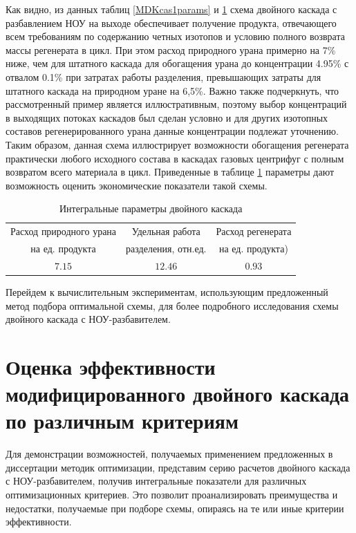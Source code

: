Как видно, из данных таблиц \ref{MDKcas1params} и \ref{MDKparams} схема двойного каскада с разбавлением НОУ на выходе обеспечивает получение продукта, отвечающего всем требованиям по содержанию четных изотопов и условию полного возврата массы регенерата в цикл. При этом расход природного урана примерно на 7\% ниже, чем для штатного каскада для обогащения урана до концентрации 4.95\% с отвалом 0.1\% при затратах работы разделения, превышающих затраты для штатного каскада на природном уране на 6,5\%. Важно также подчеркнуть, что рассмотренный пример является иллюстративным, поэтому выбор концентраций в выходящих потоках каскадов был сделан условно и для других изотопных составов регенерированного урана данные концентрации подлежат уточнению. Таким образом, данная схема иллюстрирует возможности обогащения регенерата практически любого исходного состава в каскадах газовых центрифуг с полным возвратом всего материала в цикл. Приведенные в таблице \ref{MDKparams} параметры дают возможность оценить экономические показатели такой схемы.

\begin{table}
\begin{tabular}{|c|c|c|}
    \hline Расход природного урана & Удельная работа & Расход регенерата \\
           на ед. продукта & разделения, отн.ед. & на ед. продукта) \\
    \hline $7.15$ & $12.46$ & $0.93$ \\
    \hline
\end{tabular}
\caption{Интегральные параметры двойного каскада}\label{MDKparams}
\end{table}


Перейдем к вычислительным экспериментам, использующим предложенный метод подбора оптимальной схемы, для более подробного исследования схемы двойного каскада с НОУ-разбавителем.

\section{Оценка эффективности модифицированного двойного каскада по различным критериям}

Для демонстрации возможностей, получаемых применением предложенных в диссертации методик оптимизации, представим серию расчетов двойного каскада с НОУ-разбавителем, получив интегральные показатели для различных оптимизационных критериев. Это позволит проанализировать преимущества и недостатки, получаемые при подборе схемы, опираясь на те или иные критерии эффективности.

